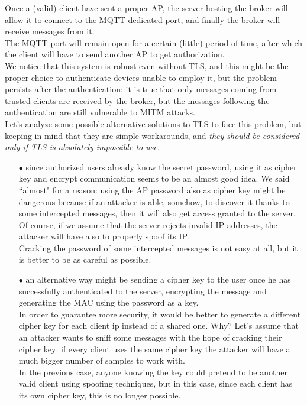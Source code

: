\documentclass[12pt]{report}
\begin{document}
{{Once a (valid) client have sent a proper AP, the server hosting the broker will allow it to connect to the MQTT dedicated port, and finally the broker will receive messages from it.\\
The MQTT port will remain open for a certain (little) period of time, after which the client will have to send another AP to get authorization.\\

We notice that this system is robust even without TLS, and this might be the proper choice to authenticate devices unable to employ it, but the problem persists after the authentication: it is true that only messages coming from trusted clients are received by the broker, but the messages following the authentication are still vulnerable to MITM attacks.\\

Let's analyze some possible alternative solutions to TLS to face this problem, but keeping in mind that they are simple workarounds, and \emph{they should be considered only if TLS is absolutely impossible to use}.

\begin{itemize}
\setlength{\itemindent}{+4mm}
\item[$\bullet$] since authorized users already know the secret password, using it as cipher key and encrypt communication seems to be an almost good idea. We said ``almost" for a reason: using the AP password also as cipher key might be dangerous because if an attacker is able, somehow, to discover it thanks to some intercepted messages, then it will also get access granted to the server.\\
Of course, if we assume that the server rejects invalid IP addresses, the attacker will have also to properly spoof its IP.\\
Cracking the password of some intercepted messages is not easy at all, but it is better to be as careful as possible.
\item[$\bullet$] an alternative way might be sending a cipher key to the user once he has successfully authenticated to the server, encrypting the message and generating the MAC using the password as a key. \\
In order to guarantee more security, it would be better to generate a different cipher key for each client ip instead of a shared one. Why?
Let's assume that an attacker wants to sniff some messages with the hope of cracking their cipher key: if every client uses the same cipher key the attacker will have a much bigger number of samples to work with.\\
In the previous case, anyone knowing the key could pretend to be another valid client using spoofing techniques, but in this case, since each client has its own cipher key, this is no longer possible.\\



\end{itemize}}}
\end{document}
